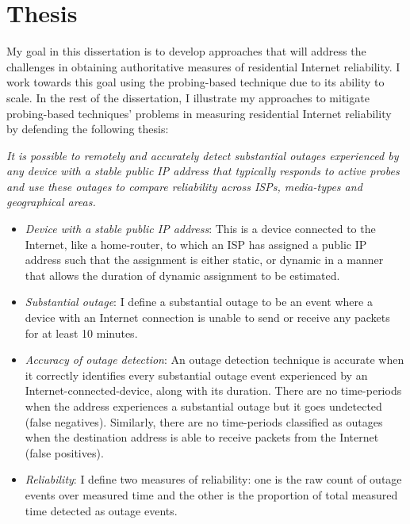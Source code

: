 
\section{Thesis}


My goal in this dissertation is to develop approaches that will
address the challenges in obtaining authoritative measures of
residential Internet reliability. I work towards this goal using the
probing-based technique due to its ability to scale. In the rest of
the dissertation, I illustrate my approaches to mitigate probing-based
techniques' problems in measuring residential Internet reliability
by defending the following thesis:

\emph{It is possible to remotely and accurately detect substantial outages
  experienced by any device with a stable public IP address that typically
  responds to active probes and use these outages to compare
  reliability across ISPs, media-types and geographical areas.} 

\begin{itemize}

\item {\emph{Device with a stable public IP address}: This is a device
    connected to the Internet, like a
home-router, to which an ISP has assigned a public IP address such
that the
assignment is either static, or dynamic in a manner that allows the
duration of dynamic assignment to be estimated.}

\item {\emph{Substantial outage}: I define a substantial outage to be an event where a device
    with an Internet connection is unable to send or receive any
    packets for at least 10 minutes.}

\item {\emph{Accuracy of outage detection}: An outage detection technique is accurate when it
correctly identifies every substantial outage event experienced by an Internet-connected-device, along with its
duration. There are no time-periods when the address
experiences a substantial outage but it goes undetected (false
negatives). Similarly, there are no time-periods classified as
outages when the destination address is able to receive packets from the
Internet (false positives).}

\item {\emph{Reliability}: I define two measures of reliability: one is the raw count of outage
events over measured time and the other is the proportion of total measured time
detected as outage events.}

\end{itemize}

